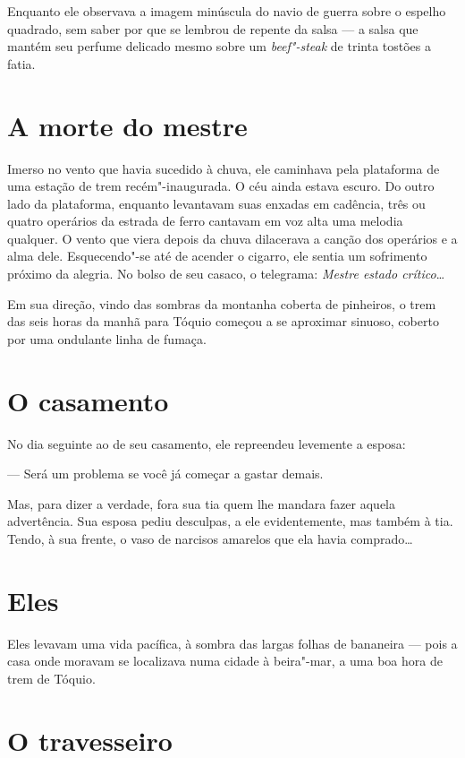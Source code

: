 Enquanto ele observava a imagem minúscula do navio de guerra sobre o
espelho quadrado, sem saber por que se lembrou de repente da salsa --- a
salsa que mantém seu perfume delicado mesmo sobre um
\textit{beef"-steak} de trinta tostões a fatia.

\section{A morte do mestre}

Imerso no vento que havia sucedido à chuva, ele caminhava pela
plataforma de uma estação de trem recém"-inaugurada. O céu ainda estava
escuro. Do outro lado da plataforma, enquanto levantavam suas enxadas
em cadência, três ou quatro operários da estrada de ferro cantavam em
voz alta uma melodia qualquer. O vento que viera depois da chuva
dilacerava a canção dos operários e a alma dele. Esquecendo"-se até de
acender o cigarro, ele sentia um sofrimento próximo da alegria. No
bolso de seu casaco, o telegrama: \textit{Mestre estado crítico}\ldots{}

Em sua direção, vindo das sombras da montanha coberta de pinheiros, o
trem das seis horas da manhã para Tóquio começou a se aproximar
sinuoso, coberto por uma ondulante linha de fumaça.

\section{O casamento}

No dia seguinte ao de seu casamento, ele repreendeu levemente a esposa:

--- Será um problema se você já começar a gastar demais.

Mas, para dizer a verdade, fora sua tia quem lhe mandara fazer aquela
advertência. Sua esposa pediu desculpas, a ele evidentemente, mas
também à tia. Tendo, à sua frente, o vaso de narcisos amarelos que ela
havia comprado\ldots{}

\section{Eles}

Eles levavam uma vida pacífica, à sombra das largas folhas de bananeira
--- pois a casa onde moravam se localizava numa cidade à beira"-mar, a uma
boa hora de trem de Tóquio.

\section{O travesseiro}

